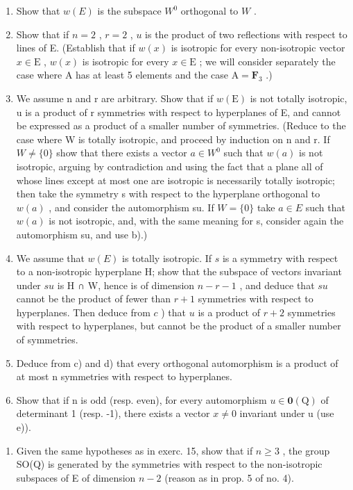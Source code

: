 \begin{enumerate}
\def\labelenumi{\alph{enumi})}
\item
  Show that \(w(E)\) is the subspace \(W^{0}\) orthogonal to \(W\) .
\item
  Show that if \(n=2\) , \(r=2\) , \(u\) is the product of two reflections with respect to lines of E. (Establish that if \(w(x)\) is isotropic for every non-isotropic vector \(x\in\mathrm{E}\) , \(w(x)\) is isotropic for every \(x\in\mathrm{E}\) ; we will consider separately the case where A has at least 5 elements and the case \(\mathrm{A}=\mathbf{F}_{3}\) .)
\item
  We assume n and r are arbitrary. Show that if \(w(\mathrm{E})\) is not totally isotropic, u is a product of r symmetries with respect to hyperplanes of E, and cannot be expressed as a product of a smaller number of symmetries. (Reduce to the case where W is totally isotropic, and proceed by induction on n and r. If \(W \neq \{0\}\) show that there exists a vector \(a \in W^{0}\) such that \(w(a)\) is not isotropic, arguing by contradiction and using the fact that a plane all of whose lines except at most one are isotropic is necessarily totally isotropic; then take the symmetry s with respect to the hyperplane orthogonal to \(w(a)\) , and consider the automorphism su. If \(W = \{0\}\) take \(a \in E\) such that \(w(a)\) is not isotropic, and, with the same meaning for s, consider again the automorphism su, and use b).)
\item
  We assume that \(w(E)\) is totally isotropic. If \(s\) is a symmetry with respect to a non-isotropic hyperplane H; show that the subspace of vectors invariant under \(su\) is H ∩ W, hence is of dimension \(n-r-1\) , and deduce that \(su\) cannot be the product of fewer than \(r+1\) symmetries with respect to hyperplanes. Then deduce from \(c\) ) that \(u\) is a product of \(r+2\) symmetries with respect to hyperplanes, but cannot be the product of a smaller number of symmetries.
\item
  Deduce from c) and d) that every orthogonal automorphism is a product of at most n symmetries with respect to hyperplanes.
\item
  Show that if n is odd (resp. even), for every automorphism \(u \in \mathbf{0}(\mathrm{Q})\) of determinant 1 (resp. -1), there exists a vector \(x \neq 0\) invariant under u (use e)).
\end{enumerate}

\begin{enumerate}
\def\labelenumi{\arabic{enumi})}
\setcounter{enumi}{15}
\tightlist
\item
  Given the same hypotheses as in exerc. 15, show that if \(n \geqslant 3\) , the group SO(Q) is generated by the symmetries with respect to the non-isotropic subspaces of E of dimension \(n - 2\) (reason as in prop. 5 of no. 4).
\end{enumerate}

